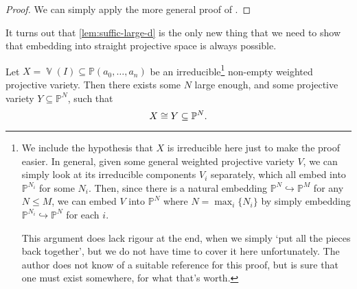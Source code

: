 \documentclass[10pt,notitlepage]{article}
\numberwithin{equation}{subsection}
\DeclareMathOperator{\van}{\mathbb{V}}
\newcommand{\pee}{\mathbb{P}}
\newcommand{\pazn}{\pee(a_0,\ldots,a_n)}
\begin{document}
        \begin{proof}
            We can simply apply the more general proof of \cite[Lemma~5.5.3]{Tevelev:jdT35_ao}.
        \end{proof}

        It turns out that \cref{lem:suffic-large-d} is the only new thing that we need to show that embedding into straight projective space is always possible.
        
        \begin{theorem}\label{thm:straightening-wps}
            Let $X=\van(I)\subseteq\pazn$ be an irreducible\footnote{%
                We include the hypothesis that $X$ is irreducible here just to make the proof easier.
                In general, given some general weighted projective variety $V$, we can simply look at its irreducible components $V_i$ separately, which all embed into $\pee^{N_i}$ for some $N_i$.
                Then, since there is a natural embedding $\pee^N\hookrightarrow\pee^M$ for any $N\leqslant M$, we can embed $V$ into $\pee^N$ where $N=\max_i\{N_i\}$ by simply embedding $\pee^{N_i}\hookrightarrow\pee^N$ for each $i$.

                This argument does lack rigour at the end, when we simply `put all the pieces back together', but we do not have time to cover it here unfortunately.
                The author does not know of a suitable reference for this proof, but is sure that one must exist somewhere, for what that's worth.
            } non-empty weighted projective variety.
            Then there exists some $N$ large enough, and some projective variety $Y\subseteq\pee^N$, such that
            \[
                X\cong Y\subseteq\pee^N.\qedhere
            \]
        \end{theorem}
\end{document}
